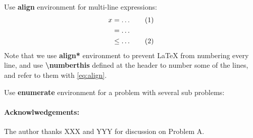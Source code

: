\documentclass[a4 paper,12pt]{article}
\newcommand\numberthis{\addtocounter{equation}{1}\tag{\theequation}}
\begin{document}
	Use \textbf{align} environment for multi-line expressions:
	\begin{align*}
	x &= \ldots \numberthis \label{eq:align} \\
	&= \ldots \\
	&\le \ldots \numberthis
	\end{align*}
	Note that we use \textbf{align*} environment to prevent \LaTeX{}  
	from numbering every line, and use \textbf{\textbackslash numberthis} defined at the header to number some of the lines, and refer to them with \eqref{eq:align}.
	
	\newpage
	Use \textbf{enumerate} environment for a problem with several sub problems:
	
	
	\paragraph{Acknowlwedgements:} The author thanks XXX and YYY for discussion on Problem A.
	
    
\end{document}
